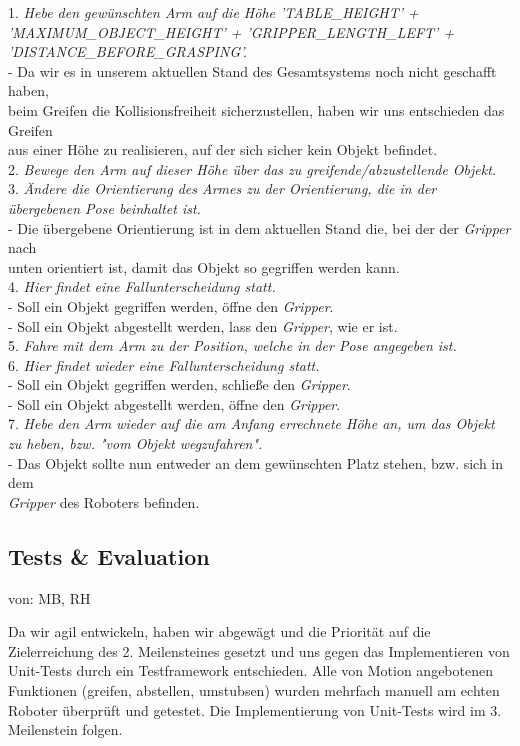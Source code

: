 \documentclass{suturo}
\makeatletter
\newcommand{\chapterauthor}[1]{%
  {\parindent0pt\vspace*{-27pt}%
  \linespread{0}\small\begin{flushright}von: #1\end{flushright}%
  \par\nobreak\vspace*{0pt}}
  \@afterheading%
}
\makeatother
\begin{document}
1. \textit{Hebe den gewünschten Arm auf die Höhe 'TABLE\_HEIGHT' + 'MAXIMUM\_OBJECT\_HEIGHT' + 'GRIPPER\_LENGTH\_LEFT' + 'DISTANCE\_BEFORE\_GRASPING'.}\\
\tab - Da wir es in unserem aktuellen Stand des Gesamtsystems noch nicht geschafft haben, \\ \tab beim Greifen die Kollisionsfreiheit sicherzustellen, haben wir uns entschieden das Greifen\\ \tab aus einer Höhe zu realisieren, auf der sich sicher kein Objekt befindet.\\

2. \textit{Bewege den Arm auf dieser Höhe über das zu greifende/abzustellende Objekt.}\\

3. \textit{Ändere die Orientierung des Armes zu der Orientierung, die in der übergebenen Pose beinhaltet ist.}\\
\tab - Die übergebene Orientierung ist in dem aktuellen Stand die, bei der der \textit{Gripper} nach \\ \tab unten orientiert ist, damit das Objekt so gegriffen werden kann.\\

4. \textit{Hier findet eine Fallunterscheidung statt.}\\
\tab - Soll ein Objekt gegriffen werden, öffne den \textit{Gripper}.\\
\tab - Soll ein Objekt abgestellt werden, lass den \textit{Gripper}, wie er ist.\\

5. \textit{Fahre mit dem Arm zu der Position, welche in der Pose angegeben ist.}\\

6. \textit{Hier findet wieder eine Fallunterscheidung statt.}\\
\tab - Soll ein Objekt gegriffen werden, schließe den \textit{Gripper}.\\
\tab - Soll ein Objekt abgestellt werden, öffne den \textit{Gripper}.\\

7. \textit{Hebe den Arm wieder auf die am Anfang errechnete Höhe an, um das Objekt zu heben, bzw. "vom Objekt wegzufahren".}\\
\tab - Das Objekt sollte nun entweder an dem gewünschten Platz stehen, bzw. sich in dem\\ \tab \textit{Gripper} des Roboters befinden.


\subsection{Tests \& Evaluation}
\chapterauthor{MB, RH}
Da wir agil entwickeln, haben wir abgewägt und die Priorität auf die Zielerreichung des 2.
Meilensteines gesetzt und uns gegen das Implementieren von Unit-Tests durch ein Testframework entschieden. Alle von Motion angebotenen Funktionen (greifen, abstellen, umstubsen) wurden mehrfach manuell am echten Roboter überprüft und getestet. Die Implementierung von Unit-Tests wird im 3. Meilenstein folgen. \\
\end{document}
